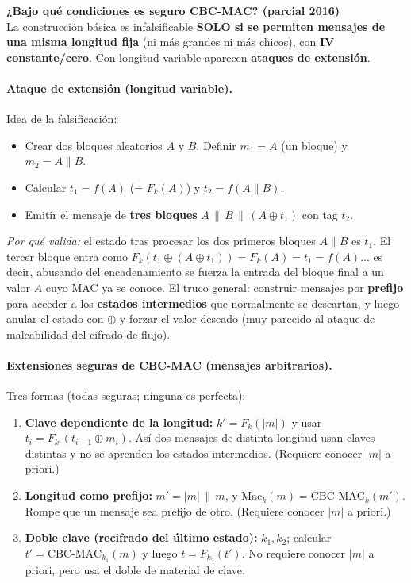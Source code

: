 \documentclass[../main.tex]{subfiles}
\begin{document}
\begin{examen}
\textbf{¿Bajo qué condiciones es seguro CBC-MAC? (parcial 2016)}\\
La construcción básica es infalsificable \textbf{SOLO si se permiten mensajes de una
misma longitud fija} (ni más grandes ni más chicos), con \textbf{IV constante/cero}.
Con longitud variable aparecen \textbf{ataques de extensión}.
\end{examen}

\paragraph{Ataque de extensión (longitud variable).} Idea de la falsificación:
\begin{itemize}[leftmargin=1.4em,nosep]
  \item Crear dos bloques aleatorios $A$ y $B$. Definir $m_1 = A$ (un bloque) y $m_2 = A\|B$.
  \item Calcular $t_1 = f(A)$ (= $F_k(A)$) y $t_2 = f(A\|B)$.
  \item Emitir el mensaje de \textbf{tres bloques} $A \,\|\, B \,\|\, (A \oplus t_1)$ con tag $t_2$.
\end{itemize}
\emph{Por qué valida:} el estado tras procesar los dos primeros bloques $A\|B$ es
$t_1$. El tercer bloque entra como $F_k(t_1 \oplus (A\oplus t_1)) = F_k(A) = t_1 = f(A)$...
es decir, abusando del encadenamiento se fuerza la entrada del bloque final a un valor
$A$ cuyo MAC ya se conoce. El truco general: construir mensajes por \textbf{prefijo}
para acceder a los \textbf{estados intermedios} que normalmente se descartan, y luego
anular el estado con $\oplus$ y forzar el valor deseado (muy parecido al ataque de
maleabilidad del cifrado de flujo).

\paragraph{Extensiones seguras de CBC-MAC (mensajes arbitrarios).} Tres formas (todas
seguras; ninguna es perfecta):
\begin{enumerate}[leftmargin=1.6em,nosep]
  \item \textbf{Clave dependiente de la longitud:} $k' = F_k(|m|)$ y usar $t_i = F_{k'}(t_{i-1}\oplus m_i)$.
  Así dos mensajes de distinta longitud usan claves distintas y no se aprenden los
  estados intermedios. (Requiere conocer $|m|$ a priori.)
  \item \textbf{Longitud como prefijo:} $m' = |m| \,\|\, m$, y $\mathrm{Mac}_k(m)=\mathrm{CBC\text{-}MAC}_k(m')$.
  Rompe que un mensaje sea prefijo de otro. (Requiere conocer $|m|$ a priori.)
  \item \textbf{Doble clave (recifrado del último estado):} $k_1, k_2$; calcular
  $t' = \mathrm{CBC\text{-}MAC}_{k_1}(m)$ y luego $t = F_{k_2}(t')$. No requiere conocer
  $|m|$ a priori, pero usa el doble de material de clave.
\end{enumerate}
\end{document}
